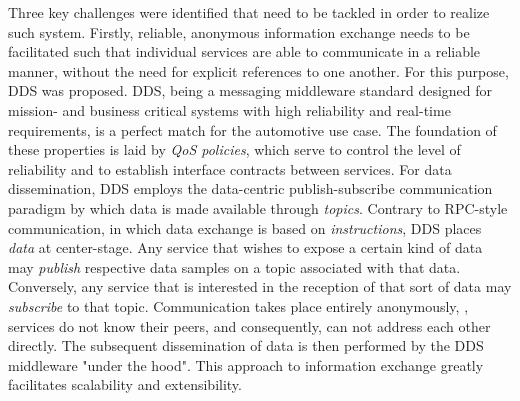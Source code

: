 Three key challenges were identified that need to be tackled in order to realize such system. Firstly, reliable, anonymous information exchange needs to be facilitated such that individual services are able to communicate in a reliable manner, without the need for explicit references to one another. For this purpose, DDS was proposed. DDS, being a messaging middleware standard designed for mission- and business critical systems with high reliability and real-time requirements, is a perfect match for the automotive use case.
The foundation of these properties is laid by \emph{QoS policies}, which serve to control the level of reliability and to establish interface contracts between services. For data dissemination, DDS employs the data-centric publish-subscribe communication paradigm by which data is made available through \emph{topics}. Contrary to RPC-style communication, in which data exchange is based on \emph{instructions}, DDS places \emph{data} at center-stage. Any service that wishes to expose a certain kind of data may \emph{publish} respective data samples on a topic associated with that data. Conversely, any service that is interested in the reception of that sort of data may \emph{subscribe} to that topic. Communication takes place entirely anonymously, \ie, services do not know their peers, and consequently, can not address each other directly. The subsequent dissemination of data is then performed by the DDS middleware "under the hood". This approach to information exchange greatly facilitates scalability and extensibility.

